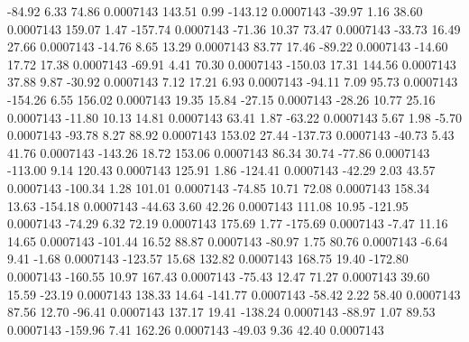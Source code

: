       -84.92        6.33       74.86     0.0007143
      143.51        0.99     -143.12     0.0007143
      -39.97        1.16       38.60     0.0007143
      159.07        1.47     -157.74     0.0007143
      -71.36       10.37       73.47     0.0007143
      -33.73       16.49       27.66     0.0007143
      -14.76        8.65       13.29     0.0007143
       83.77       17.46      -89.22     0.0007143
      -14.60       17.72       17.38     0.0007143
      -69.91        4.41       70.30     0.0007143
     -150.03       17.31      144.56     0.0007143
       37.88        9.87      -30.92     0.0007143
        7.12       17.21        6.93     0.0007143
      -94.11        7.09       95.73     0.0007143
     -154.26        6.55      156.02     0.0007143
       19.35       15.84      -27.15     0.0007143
      -28.26       10.77       25.16     0.0007143
      -11.80       10.13       14.81     0.0007143
       63.41        1.87      -63.22     0.0007143
        5.67        1.98       -5.70     0.0007143
      -93.78        8.27       88.92     0.0007143
      153.02       27.44     -137.73     0.0007143
      -40.73        5.43       41.76     0.0007143
     -143.26       18.72      153.06     0.0007143
       86.34       30.74      -77.86     0.0007143
     -113.00        9.14      120.43     0.0007143
      125.91        1.86     -124.41     0.0007143
      -42.29        2.03       43.57     0.0007143
     -100.34        1.28      101.01     0.0007143
      -74.85       10.71       72.08     0.0007143
      158.34       13.63     -154.18     0.0007143
      -44.63        3.60       42.26     0.0007143
      111.08       10.95     -121.95     0.0007143
      -74.29        6.32       72.19     0.0007143
      175.69        1.77     -175.69     0.0007143
       -7.47       11.16       14.65     0.0007143
     -101.44       16.52       88.87     0.0007143
      -80.97        1.75       80.76     0.0007143
       -6.64        9.41       -1.68     0.0007143
     -123.57       15.68      132.82     0.0007143
      168.75       19.40     -172.80     0.0007143
     -160.55       10.97      167.43     0.0007143
      -75.43       12.47       71.27     0.0007143
       39.60       15.59      -23.19     0.0007143
      138.33       14.64     -141.77     0.0007143
      -58.42        2.22       58.40     0.0007143
       87.56       12.70      -96.41     0.0007143
      137.17       19.41     -138.24     0.0007143
      -88.97        1.07       89.53     0.0007143
     -159.96        7.41      162.26     0.0007143
      -49.03        9.36       42.40     0.0007143
